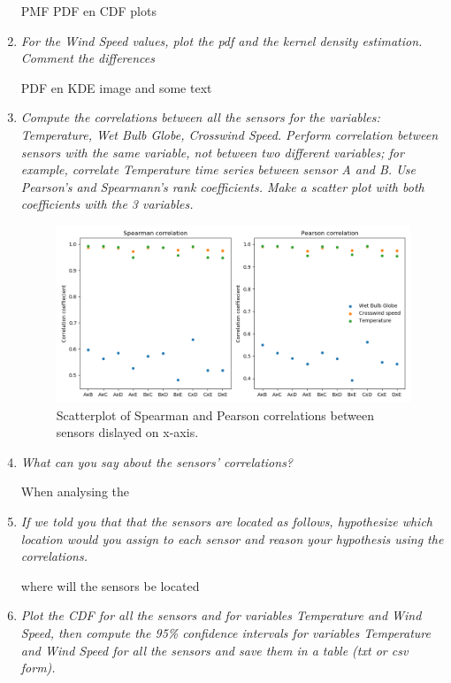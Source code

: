 \documentclass[a4paper,12pt]{article} %
\begin{document}
\begin{enumerate}
PMF PDF en CDF plots 

\item {\it For the Wind Speed values, plot the pdf and the kernel density estimation. Comment the differences}

PDF en KDE image and some text 

\item {\it Compute the correlations between all the sensors for the variables: Temperature, Wet Bulb Globe, Crosswind Speed. Perform correlation between sensors with the same variable, not between two different variables; for example, correlate Temperature time series between sensor A and B. Use Pearson’s and Spearmann’s rank coefficients. Make a scatter plot with both coefficients with the 3 variables.}

 \begin{figure}[H] 
    \centering
    \includegraphics[width=1\textwidth]{Pearson and Spearman correlations.png} 
    \caption{Scatterplot of Spearman and Pearson correlations between sensors dislayed on x-axis.} %
    \label{fig:boxplots}
  \end{figure} 

\item {\it What can you say about the sensors’ correlations?}

When analysing the 

\item {\it If we told you that that the sensors are located as follows, hypothesize which location would you assign to each sensor and reason your hypothesis using the correlations.}


where will the sensors be located

\item {\it Plot the CDF for all the sensors and for variables Temperature and Wind Speed, then compute the 95\% confidence intervals for variables Temperature and Wind Speed for all the sensors and save them in a table (txt or csv form).}


\end{enumerate}
\end{document}
